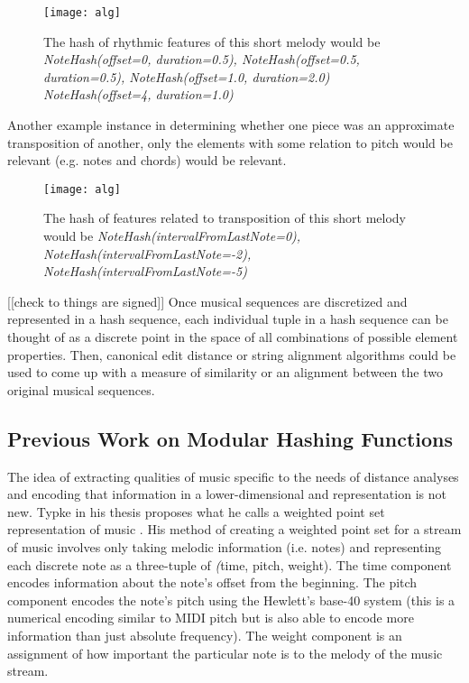 \begin{figure}[H]
\centering
\texttt{[image: alg]}
\caption{The hash of rhythmic features of this short melody would be \textit{NoteHash(offset=0, duration=0.5), NoteHash(offset=0.5, duration=0.5), NoteHash(offset=1.0, duration=2.0) NoteHash(offset=4, duration=1.0)}}
\end{figure}

Another example instance in determining whether one piece was an approximate transposition of another, only the elements with some relation to pitch would be relevant (e.g. notes and chords) would be relevant. 

\begin{figure}[H]
\centering
\texttt{[image: alg]}
\caption{The hash of features related to transposition of this short melody would be \textit{NoteHash(intervalFromLastNote=0), NoteHash(intervalFromLastNote=-2), NoteHash(intervalFromLastNote=-5)}}
\end{figure}
[[check to things are signed]]
Once musical sequences are discretized and represented in a hash sequence, each individual tuple in a hash sequence can be thought of as a discrete point in the space of all combinations of possible element properties. Then, canonical edit distance or string alignment algorithms could be used to come up with a measure of similarity or an alignment between the two original musical sequences.

\subsection{Previous Work on Modular Hashing Functions}
The idea of extracting qualities of music specific to the needs of distance analyses and encoding that information in a lower-dimensional and representation is not new. Typke in his thesis proposes what he calls a weighted point set representation of music \cite{typke}. His method of creating a weighted point set for a stream of music involves only taking melodic information (i.e. notes) and representing each discrete note as a three-tuple of \textit(time, pitch, weight). The time component encodes information about the note's offset from the beginning. The pitch component encodes the note's pitch using the Hewlett's base-40 system (this is a numerical encoding similar to MIDI pitch but is also able to encode more information than just absolute frequency). The weight component is an assignment of how important the particular note is to the melody of the music stream. 

